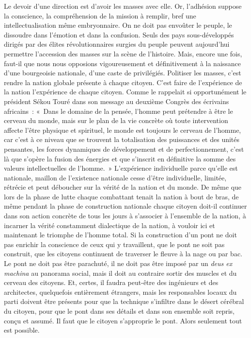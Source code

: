 \documentclass[french,twoside]{book} %
\begin{document}
\noindent Le devoir d’une direction est d’avoir les masses avec elle. Or, l’adhésion suppose la conscience, la compréhension de la mission à remplir, bref une intellectualisation même embryonnaire. On ne doit pas envoûter le peuple, le dissoudre dans l’émotion et dans la confusion. Seuls des pays sous-développés dirigés par des élites révolutionnaires surgies du peuple peuvent aujourd’hui permettre l’accession des masses sur la scène de l’histoire. Mais, encore une fois, faut-il que nous nous opposions vigoureusement et définitivement à la naissance d’une bourgeoisie nationale, d’une caste de privilégiés. Politiser les masses, c’est rendre la nation globale présente à chaque citoyen. C’est faire de l’expérience de la nation l’expérience de chaque citoyen. Comme le rappelait si opportunément le président Sékou Touré dans son message au deuxième Congrès des écrivains africains : « Dans le domaine de la pensée, l’homme peut prétendre à être le cerveau du monde, mais sur le plan de la vie concrète où toute intervention affecte l’être physique et spirituel,   le monde est toujours le cerveau de l’homme, car c’est à ce niveau que se trouvent la totalisation des puissances et des unités pensantes, les forces dynamiques de développement et de perfectionnement, c’est là que s’opère la fusion des énergies et que s’inscrit en définitive la somme des valeurs intellectuelles de l’homme. » L’expérience individuelle parce qu’elle est nationale, maillon de l’existence nationale cesse d’être individuelle, limitée, rétrécie et peut déboucher sur la vérité de la nation et du monde. De même que lors de la phase de lutte chaque combattant tenait la nation à bout de bras, de même pendant la phase de construction nationale chaque citoyen doit-il continuer dans son action concrète de tous les jours à s’associer à l’ensemble de la nation, à incarner la vérité constamment dialectique de la nation, à vouloir ici et maintenant le triomphe de l’homme total. Si la construction d’un pont ne doit pas enrichir la conscience de ceux qui y travaillent, que le pont ne soit pas construit, que les citoyens continuent de traverser le fleuve à la nage ou par bac. Le pont ne doit pas être parachuté, il ne doit pas être imposé par un \emph{deus ex machina} au panorama social, mais il doit au contraire sortir des muscles et du cerveau des citoyens. Et, certes, il faudra peut-être des ingénieurs et des architectes, quelquefois entièrement étrangers, mais les responsables locaux du parti doivent être présents pour que la technique s’infiltre dans le désert cérébral du citoyen, pour que le pont dans ses détails et dans son ensemble soit repris, conçu et assumé. Il faut que le citoyen s’approprie le pont. Alors seulement tout est possible.\par
\end{document}
